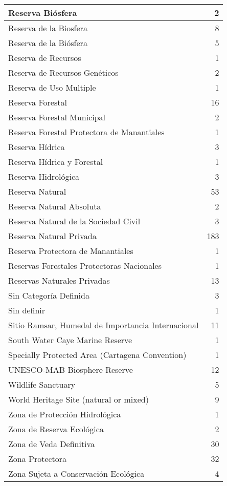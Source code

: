 \documentclass[
]{book}
\begin{document}
\begin{table}
\begin{tabular}[t]{l|r}
Reserva Biósfera & 2\\
\hline
Reserva de la Biosfera & 8\\
\hline
Reserva de la Biósfera & 5\\
\hline
Reserva de Recursos & 1\\
\hline
Reserva de Recursos Genéticos & 2\\
\hline
Reserva de Uso Multiple & 1\\
\hline
Reserva Forestal & 16\\
\hline
Reserva Forestal Municipal & 2\\
\hline
Reserva Forestal Protectora de Manantiales & 1\\
\hline
Reserva Hídrica & 3\\
\hline
Reserva Hídrica y Forestal & 1\\
\hline
Reserva Hidrológica & 3\\
\hline
Reserva Natural & 53\\
\hline
Reserva Natural Absoluta & 2\\
\hline
Reserva Natural de la Sociedad Civil & 3\\
\hline
Reserva Natural Privada & 183\\
\hline
Reserva Protectora de Manantiales & 1\\
\hline
Reservas Forestales Protectoras Nacionales & 1\\
\hline
Reservas Naturales Privadas & 13\\
\hline
Sin Categoría Definida & 3\\
\hline
Sin definir & 1\\
\hline
Sitio Ramsar, Humedal de Importancia Internacional & 11\\
\hline
South Water Caye Marine Reserve & 1\\
\hline
Specially Protected Area (Cartagena Convention) & 1\\
\hline
UNESCO-MAB Biosphere Reserve & 12\\
\hline
Wildlife Sanctuary & 5\\
\hline
World Heritage Site (natural or mixed) & 9\\
\hline
Zona de Protección Hidrológica & 1\\
\hline
Zona de Reserva Ecológica & 2\\
\hline
Zona de Veda Definitiva & 30\\
\hline
Zona Protectora & 32\\
\hline
Zona Sujeta a Conservación Ecológica & 4\\
\hline
\end{tabular}
\end{table}
\end{document}
